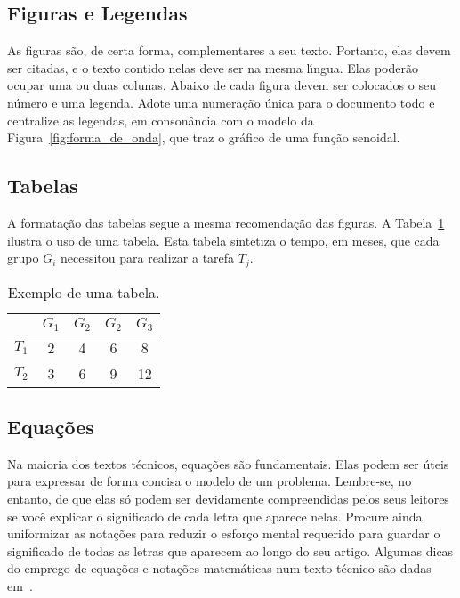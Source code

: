 \documentclass[11pt]{article}
\begin{document}
\subsection{Figuras e Legendas}
\label{sec:figuras}

As figuras s\~{a}o, de certa forma, complementares a seu texto.  Portanto,
elas devem ser citadas, e o texto contido nelas deve ser na mesma
l\'{\i}ngua. Elas poder\~{a}o ocupar uma ou duas colunas.  Abaixo de cada
figura devem ser colocados o seu n\'{u}mero e uma legenda.  Adote uma
numera\c{c}\~{a}o \'{u}nica para o documento todo e centralize as legendas, em
conson\^{a}ncia com o modelo da Figura~\ref{fig:forma_de_onda}, que traz o
gr\'{a}fico de uma fun\c{c}\~{a}o senoidal.


\subsection{Tabelas}
\label{ssec:tabelas}

A formata\c{c}\~{a}o das tabelas segue a mesma recomenda\c{c}\~{a}o das figuras.
A Tabela~\ref{tab:ex} ilustra o uso de uma tabela. Esta tabela sintetiza
o tempo, em meses, que cada grupo $G_i$ necessitou para realizar a
tarefa $T_j$.

\begin{table}[H]
  {\centering
  \begin{tabular}{|c|c|c|c|c|}
  \hline
   & $G_1$ & $G_2$ & $G_2$ & $G_3$ \\
  \hline
  $T_1$ & 2 & 4 & 6 & 8 \\
  \hline
  $T_2$ & 3 & 6 & 9 & 12 \\
  \hline
  \end{tabular}
\caption{Exemplo de uma tabela.}
\label{tab:ex}
\par}
\end{table}

\subsection{Equa\c{c}\~{o}es}
\label{ssec:equacoes}

Na maioria dos textos t\'{e}cnicos, equa\c{c}\~{o}es s\~{a}o fundamentais. Elas podem ser \'{u}teis para expressar de forma
concisa o modelo de um problema. Lembre-se, no entanto, de que elas s\'{o} podem ser devidamente compreendidas
pelos seus leitores se voc\^{e} explicar o significado de cada letra que aparece nelas. Procure ainda uniformizar
as nota\c{c}\~{o}es para reduzir o esfor\c{c}o mental requerido para guardar o significado de todas as letras que
aparecem ao longo do seu artigo. Algumas dicas do emprego de equa\c{c}\~{o}es e nota\c{c}\~{o}es matem\'{a}ticas num texto
t\'{e}cnico s\~{a}o dadas em~\cite{K99}.
\end{document}
